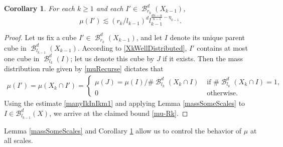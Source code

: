 \documentclass[dvipsnames,letterpaper,12pt]{article}
\numberwithin{equation}{section}
\theoremstyle{plain}
\newtheorem{corollary}{Corollary}
\theoremstyle{remark}
\DeclareMathOperator{\B}{\mathcal{B}}
\begin{document}
\begin{corollary}\label{muAtScaleRk}
For each $k\geq 1$ and each $I' \in \B^d_{r_k} (X_{k-1})$, 
	\begin{equation} 
	\mu(I') \lesssim (r_k/l_{k-1})^d l_{k-1}^{\frac{dn-\alpha}{n-1}-\eta_{k-1}}. \label{mu-Rk}
	\end{equation} 
\end{corollary}
\begin{proof}
Let us fix a cube $I' \in \B^d_{r_k}(X_{k-1})$, and let $I$ denote its unique parent cube in $\B_{l_{k-1}}^d (X_{k-1})$. According to \eqref{XkWellDistributed}, $I'$ contains at most one cube in $\B_{l_k}^d(I)$; let us denote this cube by $J$ if it exists. Then the mass distribution rule given by \eqref{muRecurse} dictates that 
\begin{align*}
\mu(I') = \mu(X_k \cap I') = \begin{cases} \mu(J) = {\mu(I)}/{\# \B_{l_k}^d(X_k \cap I)}  &\text{ if } \# \B_{l_k}^d(X_k \cap I) = 1, \\ 0 &\text{ otherwise.} \end{cases} 
\end{align*} 
Using the estimate \eqref{manyIkInIkm1} and applying Lemma \ref{massSomeScales} to $I \in \mathcal B_{l_{k-1}}^d(X)$, we arrive at the claimed bound \eqref{mu-Rk}. 
\end{proof}
Lemma \ref{massSomeScales} and Corollary \ref{muAtScaleRk} allow us to control the behavior of $\mu$ at all scales. %
\end{document}
